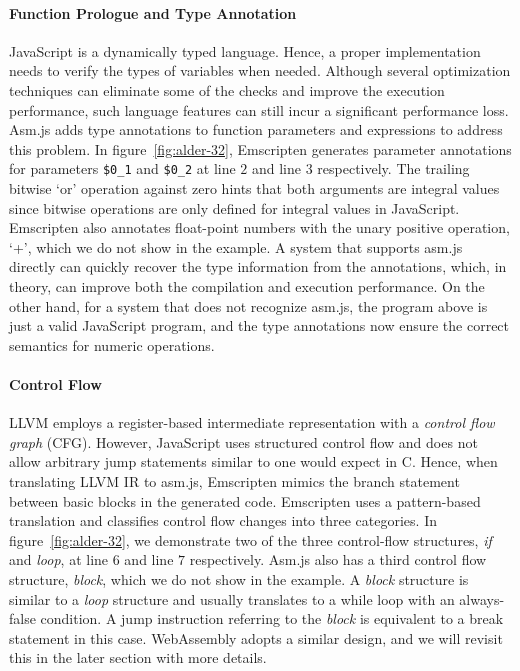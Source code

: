 \paragraph{Function Prologue and Type Annotation}
JavaScript is a dynamically typed language. Hence, a proper implementation needs to verify the types of variables when needed. Although several optimization techniques can eliminate some of the checks and improve the execution performance, such language features can still incur a significant performance loss. Asm.js adds type annotations to function parameters and expressions to address this problem. In figure~\ref{fig:alder-32}, Emscripten generates parameter annotations for parameters \texttt{\$0\_1} and \texttt{\$0\_2} at line $2$ and line $3$ respectively. The trailing bitwise `or' operation against zero hints that both arguments are integral values since bitwise operations are only defined for integral values in JavaScript. Emscripten also annotates float-point numbers with the unary positive operation, `+', which we do not show in the example. A system that supports asm.js directly can quickly recover the type information from the annotations, which, in theory, can improve both the compilation and execution performance. On the other hand, for a system that does not recognize asm.js, the program above is just a valid JavaScript program, and the type annotations now ensure the correct semantics for numeric operations.

\paragraph{Control Flow}
LLVM employs a register-based intermediate representation with a \emph{control flow graph} (CFG). However, JavaScript uses structured control flow and does not allow arbitrary jump statements similar to one would expect in C. Hence, when translating LLVM IR to asm.js, Emscripten mimics the branch statement between basic blocks in the generated code. Emscripten uses a pattern-based translation and classifies control flow changes into three categories. In figure~\ref{fig:alder-32}, we demonstrate two of the three control-flow structures, \emph{if} and \emph{loop}, at line $6$ and line $7$ respectively. Asm.js also has a third control flow structure, \emph{block}, which we do not show in the example. A \emph{block} structure is similar to a \emph{loop} structure and usually translates to a while loop with an always-false condition. A jump instruction referring to the \emph{block} is equivalent to a break statement in this case. WebAssembly adopts a similar design, and we will revisit this in the later section with more details.

